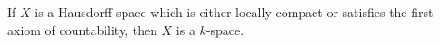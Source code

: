 If $X$ is a Hausdorff space which is either locally compact or satisfies the first axiom of countability, then $X$ is a $k$-space.
